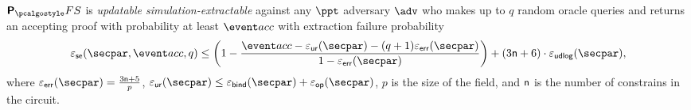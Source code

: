 \begin{corollary}
	\label{thm:plonkprotfs_se}
	$\plonkprotfs$ is \emph{updatable simulation-extractable} against any $\ppt$ adversary $\advse$ who makes up to $q$ random oracle queries and returns an accepting proof with probability at least $\accProb$ with extraction failure probability 
	\[
	\epsse(\secpar, \accProb, q) \leq \left(1 - \frac{\accProb - \epsur (\secpar) - (q + 1) \epserr (\secpar)} {1 - \epserr (\secpar)}\right) + (3 \noofc + 6) \cdot \epsudlog (\secpar)\COMMENT{ + (3 \noofc + 6) \cdot \epsid (\secpar)},
	\]
	where $\epserr (\secpar) = \frac{3 \noofc + 5}{p}$, $\epsur (\secpar) \leq \epsbind (\secpar) + \epsop (\secpar)$, $p$ is the size of the field, and $\mathsf{n}$ is the number of constrains in the circuit. 
\end{corollary}


